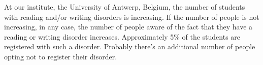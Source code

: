   At our institute, the University of Antwerp, Belgium, the number
  of students with reading and/or writing disorders is
  increasing. If the number of people is not increasing, in any
  case, the number of people aware of the fact that they have a
  reading or writing disorder increases. Approximately 5\% of the
  students are registered with such a disorder. Probably there's an
  additional number of people opting not to register their disorder.

